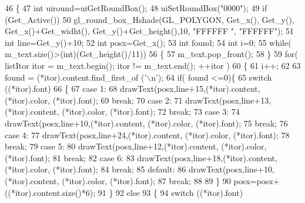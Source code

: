 \begin{DoxyCode}
46 \{
47     \textcolor{keywordtype}{int} uiround=uiGetRoundBox();
48     uiSetRoundBox(\textcolor{stringliteral}{"0000"});
49     \textcolor{keywordflow}{if} (Get\_Active())
50     gl\_round\_box\_Hshade(GL\_POLYGON, Get\_x(), Get\_y(), Get\_x()+Get\_widht(), Get\_y()+Get\_height(),10, \textcolor{stringliteral}{"FFFFFF
      "},  \textcolor{stringliteral}{"FFFFFF"});
51     \textcolor{keywordtype}{int} line=Get\_y()+10;
52     \textcolor{keywordtype}{int} posx=Get\_x();
53     \textcolor{keywordtype}{int} found;
54     \textcolor{keywordtype}{int} i=0;
55     \textcolor{keywordflow}{while}( m\_text.size()>(int)(Get\_height()/11))
56     \{
57         m\_text.pop\_front();
58     \}
59     \textcolor{keywordflow}{for}( listItor itor = m\_text.begin(); itor != m\_text.end(); ++itor )
60     \{
61         i++;
62 
63         found = (*itor).content.find\_first\_of (\textcolor{charliteral}{'\(\backslash\)n'});
64         \textcolor{keywordflow}{if}( found <=0)\{
65         \textcolor{keywordflow}{switch} ((*itor).font)
66         \{
67             \textcolor{keywordflow}{case} 1:
68                 drawText(posx,line+15,(*itor).content, (*itor).color, (*itor).font);
69                 \textcolor{keywordflow}{break};
70             \textcolor{keywordflow}{case} 2:
71                 drawText(posx,line+13,(*itor).content, (*itor).color, (*itor).font);
72                 \textcolor{keywordflow}{break};
73             \textcolor{keywordflow}{case} 3:
74                 drawText(posx,line+10,(*itor).content, (*itor).color, (*itor).font);
75                 \textcolor{keywordflow}{break};
76             \textcolor{keywordflow}{case} 4:
77                 drawText(posx,line+24,(*itor).content, (*itor).color, (*itor).font);
78                 \textcolor{keywordflow}{break};
79             \textcolor{keywordflow}{case} 5:
80                 drawText(posx,line+12,(*itor).content, (*itor).color, (*itor).font);
81                 \textcolor{keywordflow}{break};
82             \textcolor{keywordflow}{case} 6:
83                 drawText(posx,line+18,(*itor).content, (*itor).color, (*itor).font);
84                 \textcolor{keywordflow}{break};
85             \textcolor{keywordflow}{default}:
86                 drawText(posx,line+10,(*itor).content, (*itor).color, (*itor).font);
87                 \textcolor{keywordflow}{break};
88                 
89         \}
90         posx=posx+((*itor).content.size()*6);
91         \}
92         \textcolor{keywordflow}{else}
93         \{
94             \textcolor{keywordflow}{switch} ((*itor).font)

\end{DoxyCode}

